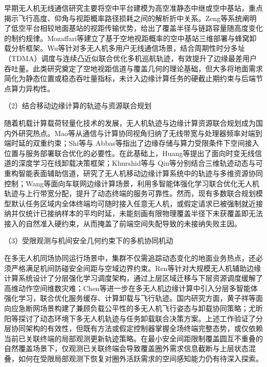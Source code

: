 早期无人机无线通信研究主要将空中平台建模为高空准静态中继或空中基站，重点揭示飞行高度、仰角与视距概率路径损耗之间的解析折中关系。Zeng等系统阐明了低空平台相较地面基站的视距传输优势，给出了覆盖半径与链路容量随高度变化的制约规律。Mozaffari等建立了基于空地视距概率的空中基站三维部署与蜂窝卸载分析框架。Wu等针对多无人机多用户无线通信场景，结合周期性时分多址（TDMA）调度与连续凸近似联合优化多机巡航轨迹，有效提升了边缘最差用户吞吐量。此类研究奠定了空地视距信道与覆盖几何的理论基础，但大多将地面需求简化为静态位置或稳态吞吐量指标，未计入边缘计算任务的硬截止期约束与后端节点算力异构性。

（2）结合移动边缘计算的轨迹与资源联合规划

随着机载计算载荷轻量化技术的发展，无人机轨迹与边缘计算资源联合规划成为国内外研究热点\cite{mao2017survey,shi2016edge,abbas2018mobile}。Mao等从通信与计算协同视角归纳了无线带宽与处理器频率对端到端时延的双重约束；Shi等与 Abbas等指出了边缘存储与算力受限条件下空间接入位置与服务部署联合优化的必要性。在此基础上，Huang等提出了面向时变无线信道的深度学习在线卸载决策框架；Khurshid等与 Qin等分别结合三维轨迹动态与可重构智能表面辅助信道，研究了无人机移动边缘计算系统中的轨迹与多维资源协同控制；Wang等面向车联网边缘计算场景，利用多智能体强化学习联合优化无人机轨迹与上行带宽分配，提升了动态终端的服务可靠性。然而，现有多数联合规划模型默认任务区域内全体终端均可随时接入任意无人机，或假定请求已被强制就近接纳并仅统计已接纳样本的平均时延，未能刻画有限物理覆盖半径下未获覆盖即无法接入的自然准入硬约束，从而掩盖了前端空间失配导致的未接纳失败主因。

（3）受限观测与机间安全几何约束下的多机协同机动

在多无人机同场协同运行场景中，集群不仅需追踪动态变化的地面业务热点，还必须严格满足机间防碰安全间距与空域边界约束\cite{chung2018swarm}。Ren等针对大规模无人机辅助边缘计算系统设计了分层强化学习调度架构，通过上层区域迁移与下层资源调度缓解了高维动作空间维数灾难；Chen等进一步在多无人机边缘计算中引入分层多智能体强化学习，联合优化服务缓存、计算卸载与飞行轨迹。国内研究方面，黄子祥等面向应急断网场景构建了兼顾负载公平性的多无人机飞行姿态与卸载协同策略；尤昕阳等探讨了动态环境下多无人机轨迹与任务卸载联合决策方案。上述工作验证了分层协同架构的有效性，但既有方法或假定控制器掌握全场终端完整态势，或仅依赖当前已关联终端的局部观测更新轨迹策略。在最小安全间距限制覆盖圆互不重叠的自然覆盖场景下，仅观测已关联终端会导致覆盖圈外需求信息截断与上层状态混叠，如何在受限局部观测下恢复对圈外活跃需求的空间感知能力仍有待深入探索。

